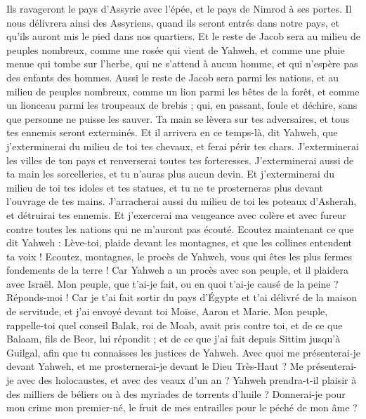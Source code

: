 \begin{multicols}{2}
Ils ravageront le pays d'Assyrie avec l'épée, et le pays de Nimrod à ses portes. Il nous délivrera ainsi des Assyriens, quand ils seront entrés dans notre pays, et qu'ils auront mis le pied dans nos quartiers.
Et le reste de Jacob sera au milieu de peuples nombreux, comme une rosée qui vient de Yahweh, et comme une pluie menue qui tombe sur l'herbe, qui ne s'attend à aucun homme, et qui n'espère pas des enfants des hommes.
Aussi le reste de Jacob sera parmi les nations, et au milieu de peuples nombreux, comme un lion parmi les bêtes de la forêt, et comme un lionceau parmi les troupeaux de brebis ; qui, en passant, foule et déchire, sans que personne ne puisse les sauver.
Ta main se lèvera sur tes adversaires, et tous tes ennemis seront exterminés.
Et il arrivera en ce temps-là, dit Yahweh, que j'exterminerai du milieu de toi tes chevaux, et ferai périr tes chars.
J'exterminerai les villes de ton pays et renverserai toutes tes forteresses.
J'exterminerai aussi de ta main les sorcelleries, et tu n'auras plus aucun devin.
Et j'exterminerai du milieu de toi tes idoles et tes statues, et tu ne te prosterneras plus devant l'ouvrage de tes mains.
J'arracherai aussi du milieu de toi les poteaux d'Asherah, et détruirai tes ennemis.
Et j'exercerai ma vengeance avec colère et avec fureur contre toutes les nations qui ne m'auront pas écouté.
\VerseOne{}Ecoutez maintenant ce que dit Yahweh : Lève-toi, plaide devant les montagnes, et que les collines entendent ta voix !
Ecoutez, montagnes, le procès de Yahweh, vous qui êtes les plus fermes fondements de la terre ! Car Yahweh a un procès avec son peuple, et il plaidera avec Israël.
Mon peuple, que t'ai-je fait, ou en quoi t'ai-je causé de la peine ? Réponds-moi !
Car je t'ai fait sortir du pays d'Égypte et t'ai délivré de la maison de servitude, et j'ai envoyé devant toi Moïse, Aaron et Marie.
Mon peuple, rappelle-toi quel conseil Balak, roi de Moab, avait pris contre toi, et de ce que Balaam, fils de Beor, lui répondit ; et de ce que j'ai fait depuis Sittim jusqu'à Guilgal, afin que tu connaisses les justices de Yahweh.
Avec quoi me présenterai-je devant Yahweh, et me prosternerai-je devant le Dieu Très-Haut ? Me présenterai-je avec des holocaustes, et avec des veaux d'un an ?
Yahweh prendra-t-il plaisir à des milliers de béliers ou à des myriades de torrents d'huile ? Donnerai-je pour mon crime mon premier-né, le fruit de mes entrailles pour le péché de mon âme ?

\end{multicols}
